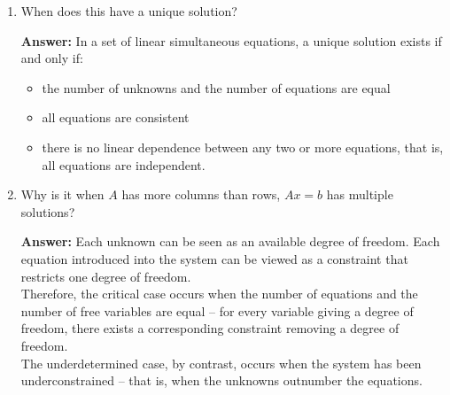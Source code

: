 \documentclass{article}
\newenvironment{QandA}{\begin{enumerate}[label=\arabic*.]}{\end{enumerate}}
\newenvironment{InnerQandA}{\begin{enumerate}[label=\roman*.]}{\end{enumerate}}
\newenvironment{answer}{\par\normalfont \textbf{Answer:}}{}
\begin{document}
\begin{QandA}
\begin{InnerQandA}
        \item When does this have a unique solution?
        \begin{answer}
            In a set of linear simultaneous equations, a unique solution exists if and only if: 
            \begin{itemize}
                \item the number of unknowns and the number of equations are equal
                \item all equations are consistent
                \item there is no linear dependence between any two or more equations, that is, all equations are independent.
            \end{itemize}
        \end{answer}
        
        \item Why is it when $A$ has more columns than rows,  $Ax=b$ has multiple solutions?
        \begin{answer}
            Each unknown can be seen as an available degree of freedom. Each equation introduced into the system can be viewed as a constraint that restricts one degree of freedom. \\
            Therefore, the critical case occurs when the number of equations and the number of free variables are equal -- for every variable giving a degree of freedom, there exists a corresponding constraint removing a degree of freedom. \\
            The underdetermined case, by contrast, occurs when the system has been underconstrained  -- that is, when the unknowns outnumber the equations.
        \end{answer}
        

\end{InnerQandA}
\end{QandA}
\end{document}

